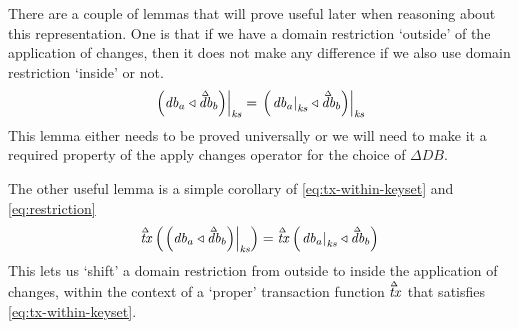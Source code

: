 \documentclass[11pt,a4paper]{article}
\newcommand\restrict[2]{\left.#1\right|_{#2}}
\newcommand\deltavar[1]{\accentset{\Delta}{#1}}
\begin{document}
There are a couple of lemmas that will prove useful later when reasoning about
this representation. One is that if we have a domain restriction `outside' of
the application of changes, then it does not make any difference if we also use
domain restriction `inside' or not.
\begin{equation}
\label{eq:restriction}
  \restrict{\left(\mathit{db}_a \triangleleft \deltavar{\mathit{db}}_b\right)}{\mathit{ks}}
=
  \restrict{\left(\restrict{\mathit{db}_a}{\mathit{ks}} \triangleleft \deltavar{\mathit{db}}_b\right)}{\mathit{ks}}
\end{equation}
This lemma either needs to be proved universally or we will need to make it a
required property of the apply changes operator for the choice of $\Delta\mathit{DB}$.

The other useful lemma is a simple corollary of \cref{eq:tx-within-keyset} and
\cref{eq:restriction}
\begin{equation}
\label{eq:restriction_corollary}
  \deltavar{\mathit{tx}}\left(\restrict{\left(\mathit{db}_a \triangleleft \deltavar{\mathit{db}}_b\right)}{\mathit{ks}}\right)
=
  \deltavar{\mathit{tx}}\left(\restrict{\mathit{db}_a}{\mathit{ks}} \triangleleft \deltavar{\mathit{db}}_b\right)
\end{equation}
This lets us `shift' a domain restriction from outside to inside the application
of changes, within the context of a `proper' transaction function
$\deltavar{\mathit{tx}}$ that satisfies \cref{eq:tx-within-keyset}.
\end{document}

